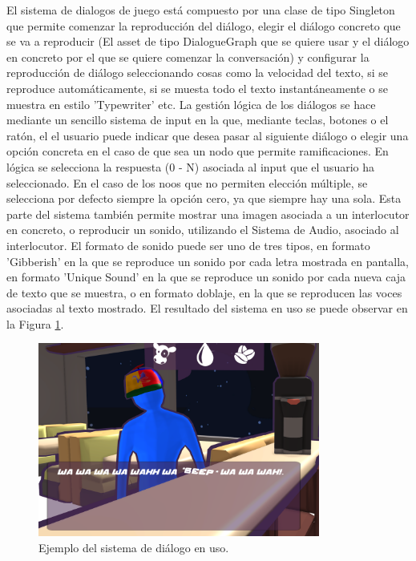El sistema de dialogos de juego está compuesto por una clase de tipo Singleton que permite comenzar la reproducción del diálogo, elegir el diálogo concreto que se va a reproducir (El asset de tipo DialogueGraph que 
se quiere usar y el diálogo en concreto por el que se quiere comenzar la conversación) y configurar la reproducción de diálogo seleccionando cosas como la velocidad del texto, si se reproduce automáticamente, si se 
muesta todo el texto instantáneamente o se muestra en estilo 'Typewriter' etc. La gestión lógica de los diálogos se hace mediante un sencillo sistema de input en la que, mediante teclas, botones o el ratón, el el usuario
puede indicar que desea pasar al siguiente diálogo o elegir una opción concreta en el caso de que sea un nodo que permite ramificaciones. En lógica se selecciona la respuesta (0 - N) asociada al input que el usuario ha 
seleccionado. En el caso de los noos que no permiten elección múltiple, se selecciona por defecto siempre la opción cero, ya que siempre hay una sola. Esta parte del sistema también permite mostrar una imagen asociada 
a un interlocutor en concreto, o reproducir un sonido, utilizando el Sistema de Audio, asociado al interlocutor. El formato de sonido puede ser uno de tres tipos, en formato 'Gibberish' en la que se reproduce un 
sonido por cada letra mostrada en pantalla, en formato 'Unique Sound' en la que se reproduce un sonido por cada nueva caja de texto que se muestra, o en formato doblaje, en la que se reproducen las voces asociadas 
al texto mostrado. El resultado del sistema en uso se puede observar en la Figura \ref{fig:dialogueExample}.

\begin{figure}[H]
  \centering
    \includegraphics[width=350px,clip=true]{dialogueExample.png}
  \caption{Ejemplo del sistema de diálogo en uso.}
  \label{fig:dialogueExample}
\end{figure}

